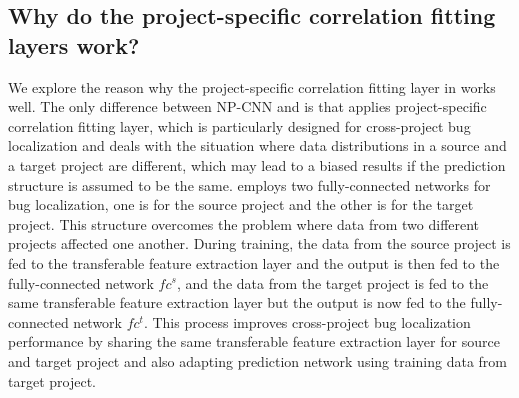 \subsection{Why do the project-specific correlation fitting layers work? }
We explore the reason why the project-specific correlation fitting layer in \TRANPCNN works well. The only difference between NP-CNN and \TRANPCNN is that \TRANPCNN applies project-specific correlation fitting layer, which is particularly designed for cross-project bug localization and deals with the situation where data distributions in a source and a target project are different, which may lead to a biased results if the prediction structure is assumed to be the same. \TRANPCNN employs two fully-connected networks for bug localization, one is for the source project and the other is for the target project. This structure overcomes the problem where data from two different projects affected one another. During training, the data from the source project is fed to the transferable feature extraction layer and the output is then fed to the fully-connected network $fc^s$, and the data from the target project is fed to the same transferable feature extraction layer but the output is now fed to the fully-connected network $fc^t$. This process improves cross-project bug localization performance by sharing the same transferable feature extraction layer for source and target project and also adapting prediction network using training data from target project. 

